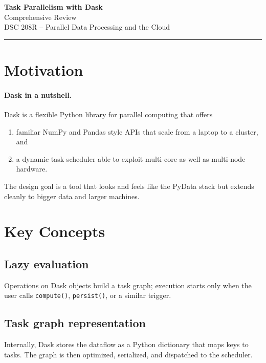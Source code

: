 \documentclass[11pt]{article}
\begin{document}
\begin{center}
  {\LARGE\bfseries Task Parallelism with Dask}\\[2mm]
  {\large Comprehensive Review}\\[1mm]
  {\normalsize DSC 208R -- Parallel Data Processing and the Cloud}
\end{center}
\vspace{-0.6em}\hrule\vspace{0.9em}

\tableofcontents
\newpage

\section{Motivation}

\paragraph{Dask in a nutshell.}
Dask is a flexible Python library for parallel computing that offers

\begin{enumerate}[itemsep=0pt]
  \item familiar NumPy and Pandas style APIs that scale from a laptop to a cluster, and
  \item a dynamic task scheduler able to exploit multi-core as well as multi-node hardware.
\end{enumerate}

The design goal is a tool that looks and feels like the PyData stack but extends cleanly to bigger data and larger machines.

\section{Key Concepts}

\subsection{Lazy evaluation}
Operations on Dask objects build a task graph; execution starts only when the user calls \texttt{compute()}, \texttt{persist()}, or a similar trigger.

\subsection{Task graph representation}
Internally, Dask stores the dataflow as a Python dictionary that maps keys to tasks.  The graph is then optimized, serialized, and dispatched to the scheduler.
\end{document}
